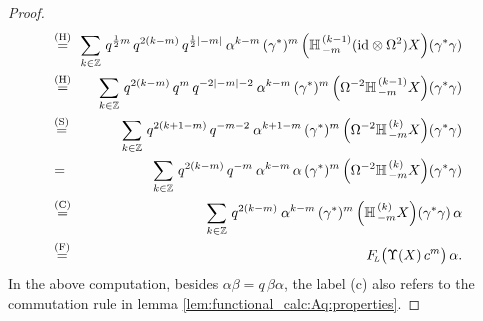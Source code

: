 \begin{proof}
\begin{eqnarray*}
\!\!\! &\stackrel{\rm (H)}{=}& \!\!
      \sum_{k\in\ZZ} \, q^{\frac{1}{2}m}\, q^{2(k-m)} \, q^{\frac{1}{2}|-m|} \:
      \alpha^{k-m}\, (\gamma^*)^m \left(\YaH{-m}{k-1}
      (\id \tens \Omega^2) X\right) \! (\gamma^*\gamma)
\\
\!\!\! &\stackrel{\rm (H)}{=}& \!\!
      \sum_{k\in\ZZ} \, q^{2(k-m)} \, q^m \, q^{-2|-m|-2} \:
      \alpha^{k-m}\, (\gamma^*)^m
      \left(\Omega^{-2} \YaH{-m}{k-1} X\right) \! (\gamma^*\gamma)
\\
\!\!\! &\stackrel{\rm (S)}{=}& \!\!
      \sum_{k\in\ZZ} \, q^{2(k+1-m)} \, q^{-m-2} \:
      \alpha^{k+1-m}\, (\gamma^*)^m
      \left(\Omega^{-2} \YaH{-m}{k} X\right) \! (\gamma^*\gamma)
\\
\!\!\!&=&\!\!
      \sum_{k\in\ZZ} \, q^{2(k-m)} \, q^{-m} \:
      \alpha^{k-m}\,  \alpha \, (\gamma^*)^m
      \left(\Omega^{-2} \YaH{-m}{k} X\right) \! (\gamma^*\gamma)
\\
\!\!\! &\stackrel{\rm (C)}{=}& \!\!
      \sum_{k\in\ZZ} \, q^{2(k-m)} \: \alpha^{k-m}\,  (\gamma^*)^m
      \left(\YaH{-m}{k} X\right) \! (\gamma^*\gamma) \, \alpha
\\
\!\!\! &\stackrel{\rm (F)}{=}& \!\!
      \FLabb \!\left(\vertM \Upsilon(X)\, c^m \right) \alpha.
\end{eqnarray*}
In the above computation, besides $\alpha\beta = q\,\beta\alpha$,
the label ({\sc c}) also refers to the commutation rule in
lemma \ref{lem:functional_calc:Aq:properties}\@.


\end{proof}
